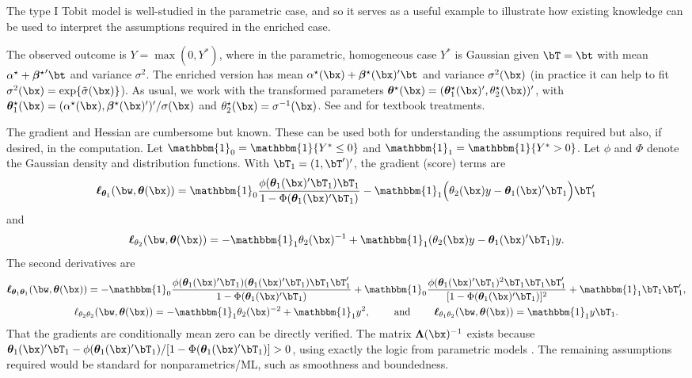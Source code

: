 \documentclass[12pt]{article}
\numberwithin{equation}{section}
\theoremstyle{definition}
\newcommand{\One}{\mathbbm{1}}
\newcommand{\btheta}{\boldsymbol{\theta}}
\newcommand{\bbeta}{\boldsymbol{\beta}}
\newcommand{\bL}{\boldsymbol{\Lambda}}
\newcommand{\ttrue}{\theta^\star}
\newcommand{\bttrue}{\btheta^\star}
\newcommand{\atrue}{\alpha^\star}
\newcommand{\bbtrue}{\bbeta^\star}
\begin{document}
\begin{appendices}
The type I Tobit model is well-studied in the parametric case, and so it serves as a useful example to illustrate how existing knowledge can be used to interpret the assumptions required in the enriched case. 

The observed outcome is $Y = \max(0,Y^*)$, where in the parametric, homogeneous case $Y^*$ is Gaussian given $\bT=\bt$ with mean $\atrue + {\bbtrue}'\bt$ and variance $\sigma^2$. The enriched version has mean $\atrue(\bx) + \bbtrue(\bx)'\bt$ and variance $\sigma^2(\bx)$ (in practice it can help to fit $\sigma^2(\bx) = \exp\{\tilde{\sigma}(\bx)\}$). As usual, we work with the transformed parameters $\bttrue(\bx) = (\bttrue_1(\bx)',\ttrue_2(\bx))'$, with $\bttrue_1(\bx) = (\atrue(\bx), \bbtrue(\bx)')'/\sigma(\bx)$ and $\ttrue_2(\bx) = \sigma^{-1}(\bx)$. See \cite{Amemiya1985_book} and \cite{Wooldridge2010_book} for textbook treatments.

The gradient and Hessian are cumbersome but known. These can be used both for understanding the assumptions required but also, if desired, in the computation. Let $\One_0 = \One\{Y^* \leq 0\}$ and $\One_1 = \One\{Y^* > 0\}$. Let $\phi$ and $\Phi$ denote the Gaussian density and distribution functions. With $\bT_1 = (1,\bT')'$, the gradient (score) terms are
\[
    \bm{\ell}_{\btheta_1}(\bw, \btheta(\bx)) = \One_0 \frac{\phi(\btheta_1(\bx)'\bT_1) \bT_1 }{1 - \Phi(\btheta_1(\bx)'\bT_1)}  -  \One_1 \Big(\theta_2(\bx) y - \btheta_1(\bx)'\bT_1\Big)\bT_1'
\]
and 
\[
    \bm{\ell}_{\theta_2}(\bw, \btheta(\bx)) =  -  \One_1 \theta_2(\bx)^{-1}  +  \One_1 (\theta_2(\bx) y - \btheta_1(\bx)'\bT_1)y.
\]
The second derivatives are
\begin{gather*}
    \bm{\ell}_{\btheta_1 \btheta_1}(\bw, \btheta(\bx)) = - \One_0 \frac{\phi(\btheta_1(\bx)'\bT_1) (\btheta_1(\bx)'\bT_1)\bT_1\bT_1'}{1 - \Phi(\btheta_1(\bx)'\bT_1)}  +  \One_0 \frac{\phi(\btheta_1(\bx)'\bT_1)^2\bT_1\bT_1\bT_1'}{[1 - \Phi(\btheta_1(\bx)'\bT_1)]^2} + \One_1  \bT_1\bT_1' ,             \\
    \ell_{\theta_2 \theta_2}(\bw, \btheta(\bx)) = - \One_1 \theta_2(\bx)^{-2} + \One_1 y^2 ,
    \qquad \text{ and } \qquad
    \bm{\ell}_{\theta_1 \theta_2}(\bw, \btheta(\bx)) =  \One_1 y \bT_1.
\end{gather*}
That the gradients are conditionally mean zero can be directly verified. The matrix $\bL(\bx)^{-1}$ exists because $\btheta_1(\bx)'\bT_1  - \phi(\btheta_1(\bx)'\bT_1) / [1 - \Phi(\btheta_1(\bx)'\bT_1)] >0$, using exactly the logic from parametric models \citep{Donald_1990,Olsen1978_Ecma,Amemiya1985_book}. The remaining assumptions required would be standard for nonparametrics/ML, such as smoothness and boundedness.








\end{appendices}
\end{document}
